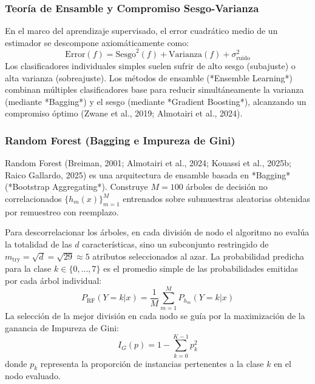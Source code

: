 \subsubsection{Teoría de Ensamble y Compromiso Sesgo-Varianza}
En el marco del aprendizaje supervisado, el error cuadrático medio de un estimador se descompone axiomáticamente como:
\begin{equation}
\mathrm{Error}(f) = \mathrm{Sesgo}^2(f) + \mathrm{Varianza}(f) + \sigma_{\mathrm{ruido}}^2
\end{equation}
Los clasificadores individuales simples suelen sufrir de alto sesgo (subajuste) o alta varianza (sobreajuste). Los métodos de ensamble (*Ensemble Learning*) combinan múltiples clasificadores base para reducir simultáneamente la varianza (mediante *Bagging*) y el sesgo (mediante *Gradient Boosting*), alcanzando un compromiso óptimo (Zwane et al., 2019; Almotairi et al., 2024).

\subsubsection{Random Forest (Bagging e Impureza de Gini)}
Random Forest (Breiman, 2001; Almotairi et al., 2024; Kouassi et al., 2025b; Raico Gallardo, 2025) es una arquitectura de ensamble basada en *Bagging* (*Bootstrap Aggregating*). Construye $M=100$ árboles de decisión no correlacionados $\{h_m(x)\}_{m=1}^M$ entrenados sobre submuestras aleatorias obtenidas por remuestreo con reemplazo.

Para descorrelacionar los árboles, en cada división de nodo el algoritmo no evalúa la totalidad de las $d$ características, sino un subconjunto restringido de $m_{\mathrm{try}} = \sqrt{d} = \sqrt{29} \approx 5$ atributos seleccionados al azar. La probabilidad predicha para la clase $k \in \{0, \dots, 7\}$ es el promedio simple de las probabilidades emitidas por cada árbol individual:
\begin{equation}
P_{\mathrm{RF}}(Y=k | x) = \frac{1}{M} \sum_{m=1}^M P_{h_m}(Y=k | x)
\end{equation}
La selección de la mejor división en cada nodo se guía por la maximización de la ganancia de Impureza de Gini:
\begin{equation}
I_G(p) = 1 - \sum_{k=0}^{K-1} p_k^2
\end{equation}
donde $p_k$ representa la proporción de instancias pertenentes a la clase $k$ en el nodo evaluado.


